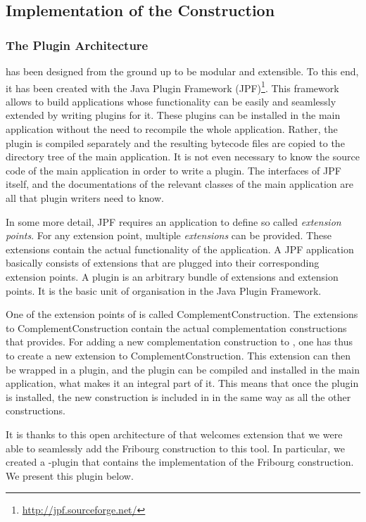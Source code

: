 \subsection{Implementation of the Construction}
\label{4_implementation}
\subsubsection{The \goal{} Plugin Architecture}
\goal{} has been designed from the ground up to be modular and extensible. To this end, it has been created with the Java Plugin Framework (JPF)\footnote{\url{http://jpf.sourceforge.net/}}. This framework allows to build applications whose functionality can be easily and seamlessly extended by writing plugins for it. These plugins can be installed in the main application without the need to recompile the whole application. Rather, the plugin is compiled separately and the resulting bytecode files are copied to the directory tree of the main application. It is not even necessary to know the source code of the main application in order to write a plugin. The interfaces of JPF itself, and the documentations of the relevant classes of the main application are all that plugin writers need to know.

In some more detail, JPF requires an application to define so called \textit{extension points}. For any extension point, multiple \textit{extensions} can be provided. These extensions contain the actual functionality of the application. A JPF application basically consists of extensions that are plugged into their corresponding extension points. A plugin is an arbitrary bundle of extensions and extension points. It is the basic unit of organisation in the Java Plugin Framework.

One of the extension points of \goal{} is called \textsf{ComplementConstruction}. The extensions to \textsf{ComplementConstruction} contain the actual complementation constructions that \goal{} provides. For adding a new complementation construction to \goal, one has thus to create a new extension to \textsf{ComplementConstruction}. This extension can then be wrapped in a plugin, and the plugin can be compiled and installed in the main application, what makes it an integral part of it. This means that once the plugin is installed, the new construction is included in \goal{} in the same way as all the other constructions.

It is thanks to this open architecture of \goal{} that welcomes extension that we were able to seamlessly add the Fribourg construction to this tool. In particular, we created a \goal-plugin that contains the implementation of the Fribourg construction. We present this plugin below.

